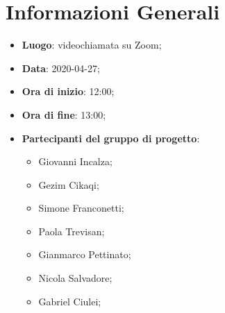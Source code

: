 \section{Informazioni Generali}
	\begin{itemize}
		\item \textbf {Luogo}: videochiamata su Zoom;
		\item \textbf {Data}: 2020-04-27;
		\item \textbf {Ora di inizio}: 12:00;
		\item \textbf {Ora di fine}: 13:00;
		\item \textbf {Partecipanti del gruppo di progetto}:
			\begin{itemize}
				\item Giovanni Incalza;
				\item Gezim Cikaqi;
				\item Simone Franconetti;
				\item Paola Trevisan;
				\item Gianmarco Pettinato;
				\item Nicola Salvadore;
				\item Gabriel Ciulei;
			\end{itemize}
	\end{itemize}